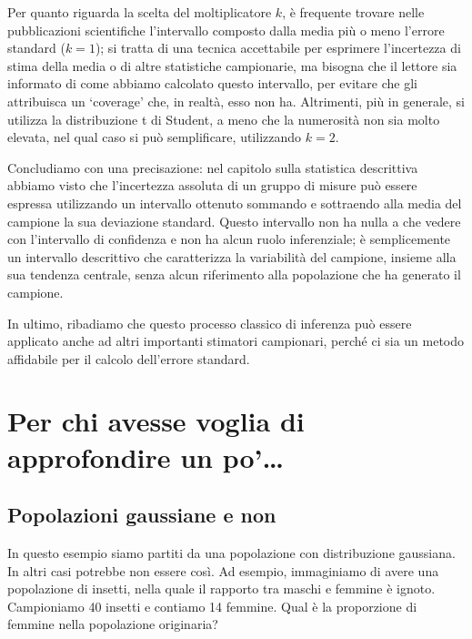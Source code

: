 \documentclass[a4paper,12pt,oneside]{book}
\begin{document}
Per quanto riguarda la scelta del moltiplicatore \(k\), è frequente trovare nelle pubblicazioni scientifiche l'intervallo composto dalla media più o meno l'errore standard (\(k = 1\)); si tratta di una tecnica accettabile per esprimere l'incertezza di stima della media o di altre statistiche campionarie, ma bisogna che il lettore sia informato di come abbiamo calcolato questo intervallo, per evitare che gli attribuisca un `coverage' che, in realtà, esso non ha. Altrimenti, più in generale, si utilizza la distribuzione t di Student, a meno che la numerosità non sia molto elevata, nel qual caso si può semplificare, utilizzando \(k = 2\).

Concludiamo con una precisazione: nel capitolo sulla statistica descrittiva abbiamo visto che l'incertezza assoluta di un gruppo di misure può essere espressa utilizzando un intervallo ottenuto sommando e sottraendo alla media del campione la sua deviazione standard. Questo intervallo non ha nulla a che vedere con l'intervallo di confidenza e non ha alcun ruolo inferenziale; è semplicemente un intervallo descrittivo che caratterizza la variabilità del campione, insieme alla sua tendenza centrale, senza alcun riferimento alla popolazione che ha generato il campione.

In ultimo, ribadiamo che questo processo classico di inferenza può essere applicato anche ad altri importanti stimatori campionari, perché ci sia un metodo affidabile per il calcolo dell'errore standard.

\hypertarget{per-chi-avesse-voglia-di-approfondire-un-po}{%
\section{Per chi avesse voglia di approfondire un po'\ldots{}}\label{per-chi-avesse-voglia-di-approfondire-un-po}}

\hypertarget{popolazioni-gaussiane-e-non}{%
\subsection{Popolazioni gaussiane e non}\label{popolazioni-gaussiane-e-non}}

In questo esempio siamo partiti da una popolazione con distribuzione gaussiana. In altri casi potrebbe non essere così. Ad esempio, immaginiamo di avere una popolazione di insetti, nella quale il rapporto tra maschi e femmine è ignoto. Campioniamo 40 insetti e contiamo 14 femmine. Qual è la proporzione di femmine nella popolazione originaria?
\end{document}
